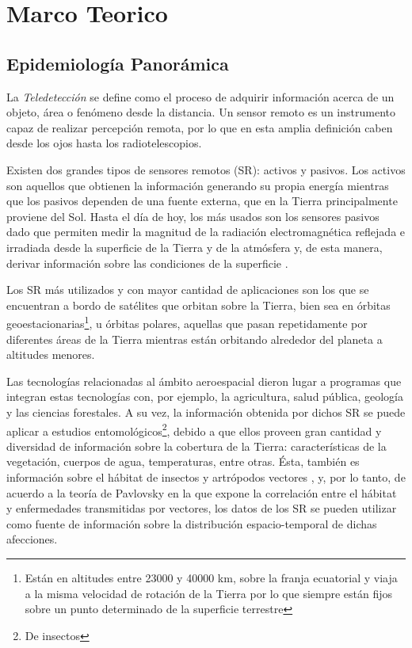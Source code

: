 



\chapter{Marco Teorico}

\section{Epidemiología Panorámica}

\justifying


\par La \textit{Teledetección} se define como el proceso de adquirir
  información acerca de un objeto, área o fenómeno desde la distancia.
  Un sensor remoto es un instrumento capaz de realizar percepción remota, por lo
  que en esta amplia definición caben desde los ojos hasta los
  radiotelescopios.

\par Existen dos grandes tipos de sensores remotos (SR): activos y pasivos.
  Los activos son aquellos que obtienen la información generando su propia energía
  mientras que los pasivos dependen de una fuente externa, que en la Tierra
  principalmente proviene del Sol. Hasta el día de hoy, los más usados son los
  sensores pasivos dado que permiten medir la magnitud de la radiación electromagnética
  reflejada e irradiada desde la superficie de la Tierra y de la atmósfera y,
  de esta manera, derivar información sobre las condiciones de la superficie \cite{cami_tartagal}.


\par Los SR más utilizados y con mayor cantidad de aplicaciones son los que se
  encuentran a bordo de satélites que orbitan sobre la Tierra, bien sea
  en órbitas geoestacionarias\footnote{Están en altitudes entre 23000 y 40000 km,
  sobre la franja ecuatorial y viaja a la misma velocidad de rotación de la Tierra
  por lo que siempre están fijos sobre un punto determinado de la superficie terrestre},
  u órbitas polares, aquellas que pasan repetidamente por diferentes áreas
  de la Tierra mientras están orbitando alrededor del planeta a altitudes menores.


\par Las tecnologías relacionadas al ámbito aeroespacial dieron lugar a programas
  que integran estas tecnologías con,
  por ejemplo, la agricultura, salud pública, geología y las ciencias forestales.
  A su vez, la información obtenida por dichos SR se puede aplicar a estudios
  entomológicos\footnote{De insectos}, debido a que ellos proveen gran cantidad
  y diversidad de información sobre la cobertura de la Tierra: características
  de la vegetación, cuerpos de agua, temperaturas, entre otras. Ésta, también es
  información sobre el hábitat de insectos y artrópodos vectores \cite{estallo_ndwi, data_driven_prediction},
  y, por lo tanto, de acuerdo a la teoría de Pavlovsky \cite{nidality} en la que
  expone la correlación entre el hábitat y enfermedades transmitidas por vectores,
  los datos de los SR se pueden utilizar como fuente de información sobre la
  distribución espacio-temporal de dichas afecciones.


